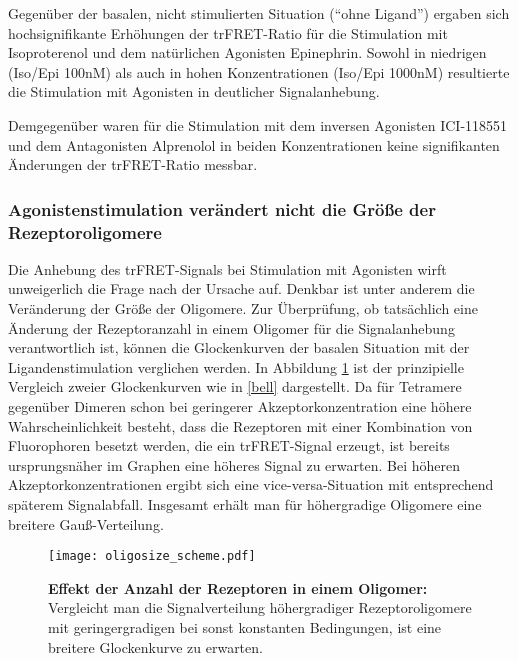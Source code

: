 Gegenüber der basalen, nicht stimulierten Situation ("`ohne Ligand"') ergaben sich hochsignifikante Erhöhungen der trFRET-Ratio für die Stimulation mit Isoproterenol und dem natürlichen Agonisten Epinephrin. Sowohl in niedrigen (Iso/Epi 100\si{\nano M}) als auch in hohen Konzentrationen (Iso/Epi 1000\si{\nano M}) resultierte die Stimulation mit Agonisten in deutlicher Signalanhebung. 

Demgegenüber waren für die Stimulation mit dem inversen Agonisten ICI-118551 und dem Antagonisten Alprenolol in beiden Konzentrationen keine signifikanten Änderungen der trFRET-Ratio messbar. 

\subsubsection{Agonistenstimulation verändert nicht die Größe der Rezeptoroligomere}
Die Anhebung des trFRET-Signals bei Stimulation mit Agonisten wirft unweigerlich die Frage nach der Ursache auf. Denkbar ist unter anderem die Veränderung der Größe der Oligomere. Zur Überprüfung, ob tatsächlich eine Änderung der Rezeptoranzahl in einem Oligomer für die Signalanhebung verantwortlich ist, können die Glockenkurven der basalen Situation mit der Ligandenstimulation verglichen werden. In Abbildung \ref{fig:oligosize_scheme} ist der prinzipielle Vergleich zweier Glockenkurven wie in \ref{bell} dargestellt. Da für Tetramere gegenüber Dimeren schon bei geringerer Akzeptorkonzentration eine höhere Wahrscheinlichkeit besteht, dass die Rezeptoren mit einer Kombination von Fluorophoren besetzt werden, die ein trFRET-Signal erzeugt, ist bereits ursprungsnäher im Graphen eine höheres Signal zu erwarten. Bei höheren Akzeptorkonzentrationen ergibt sich eine vice-versa-Situation mit entsprechend späterem Signalabfall. Insgesamt erhält man für höhergradige Oligomere eine breitere Gauß-Verteilung.

\begin{figure}[htbp]
	\centering
    \texttt{[image: oligosize\_scheme.pdf]}
    \caption{\textbf{Effekt der Anzahl der Rezeptoren in einem Oligomer:} Vergleicht man die Signalverteilung höhergradiger Rezeptoroligomere mit geringergradigen bei sonst konstanten Bedingungen, ist eine breitere Glockenkurve zu erwarten.} 
    \label{fig:oligosize_scheme}
\end{figure}

